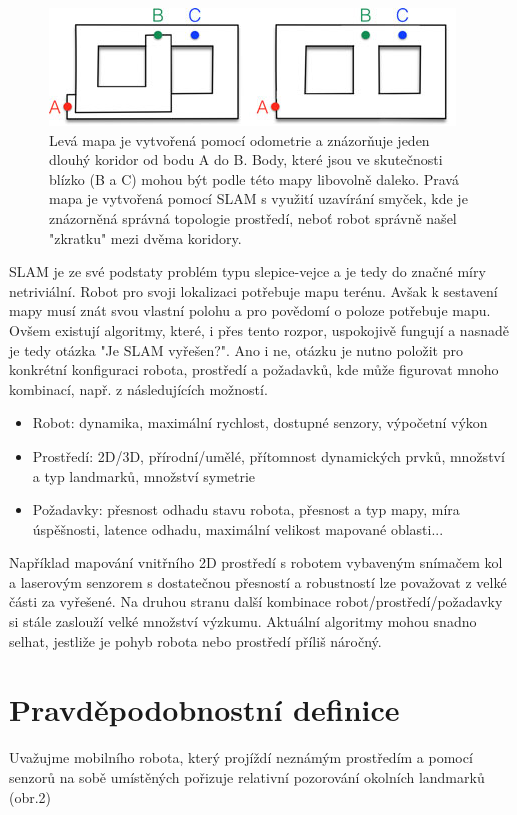 \documentclass[12pt,a4paper]{article}
\begin{document}
\begin{figure}[H]
\centering
\includegraphics[scale=1]{Obr1} 
\caption{Levá mapa je vytvořená pomocí odometrie a znázorňuje jeden dlouhý koridor od bodu A do B. Body, které jsou ve skutečnosti blízko (B a C) mohou být podle této mapy libovolně daleko. Pravá mapa je vytvořená pomocí SLAM s využití uzavírání smyček, kde je znázorněná správná topologie prostředí, neboť robot správně našel "zkratku" mezi dvěma koridory.}
\end{figure}


\newpage
SLAM je ze své podstaty problém typu slepice-vejce a je tedy do značné míry netriviální. Robot pro svoji lokalizaci potřebuje mapu terénu. Avšak k sestavení mapy musí znát svou vlastní polohu a pro povědomí o poloze potřebuje mapu. Ovšem existují algoritmy, které, i přes tento rozpor, uspokojivě fungují a nasnadě je tedy otázka "Je SLAM vyřešen?". Ano i ne, otázku je nutno položit pro konkrétní konfiguraci robota, prostředí a požadavků, kde může figurovat mnoho kombinací, např. z následujících možností.
\begin{itemize}
\item Robot: dynamika, maximální rychlost, dostupné senzory, výpočetní výkon
\item Prostředí: 2D/3D, přírodní/umělé, přítomnost dynamických prvků, množství a typ landmarků, množství symetrie
\item Požadavky: přesnost odhadu stavu robota, přesnost a typ mapy, míra úspěšnosti, latence odhadu, maximální velikost mapované oblasti...
\end{itemize}
Například mapování vnitřního 2D prostředí s robotem vybaveným snímačem kol a laserovým senzorem s dostatečnou přesností a robustností lze považovat z velké části za vyřešené. Na druhou stranu další kombinace robot/prostředí/požadavky si stále zaslouží velké množství výzkumu. Aktuální algoritmy mohou snadno selhat, jestliže je pohyb robota nebo prostředí příliš náročný.


\section{Pravděpodobnostní definice}
Uvažujme mobilního robota, který projíždí neznámým prostředím a pomocí senzorů na sobě umístěných pořizuje relativní pozorování okolních landmarků (obr.2)
\end{document}
